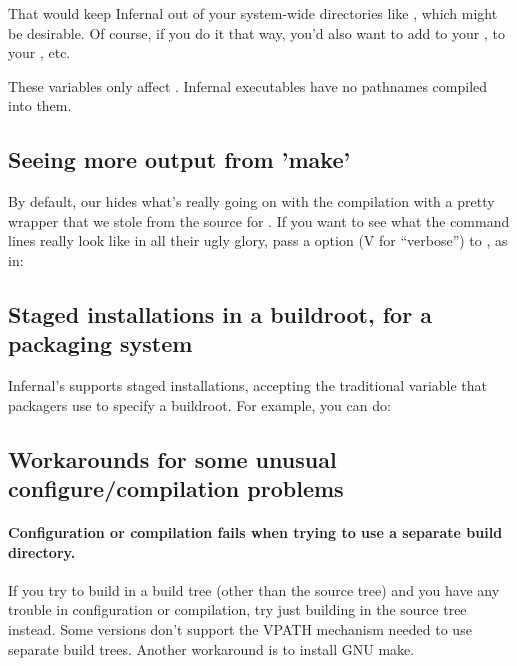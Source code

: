 
That would keep Infernal out of your system-wide directories like
, which might be desirable. Of course, if you do
it that way, you'd also want to add  to
your ,  to your
, etc.

These variables only affect . Infernal executables
have no pathnames compiled into them.

\subsection{Seeing more output from 'make'}

By default, our  hides what's really going on with the
compilation with a pretty wrapper that we stole from the source for
. If you want to see what the command lines really look like
in all their ugly glory, pass a  option (V for ``verbose'')
to , as in:

  \vspace{1ex}
  \vspace{1ex}

\subsection{Staged installations in a buildroot, for a packaging system}

Infernal's  supports staged installations, accepting
the traditional  variable that packagers use to specify
a buildroot. For example, you can do:


\subsection{Workarounds for some unusual configure/compilation problems}

\paragraph{Configuration or compilation fails when trying to use a
  separate build directory.}  If you try to build in a build tree
(other than the source tree) and you have any trouble in configuration
or compilation, try just building in the source tree instead. Some
 versions don't support the VPATH mechanism needed to use
separate build trees. Another workaround is to install GNU make.


